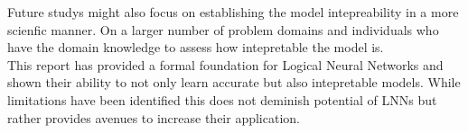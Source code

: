 Future studys might also focus on establishing the model intepreability in a more scienfic manner. On a larger number of problem domains and individuals who have the domain knowledge to assess how intepretable the model is.\\

This report has provided a formal foundation for Logical Neural Networks and shown their ability to not only learn accurate but also intepretable models. While limitations have been identified this does not deminish potential of LNNs but rather provides avenues to increase their application.




